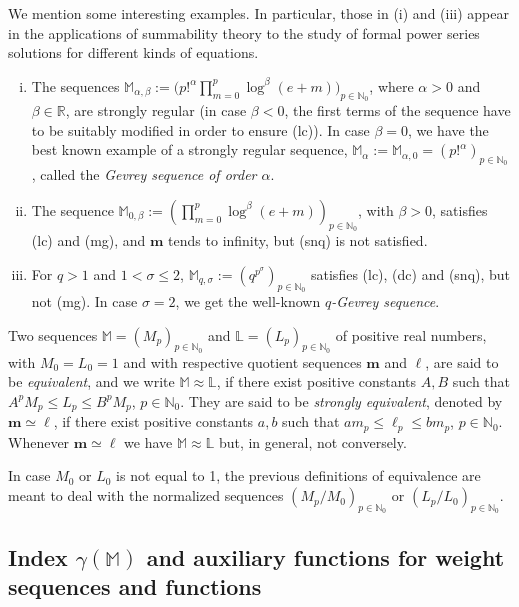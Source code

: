 \documentclass[11pt,a4paper]{article}
\theoremstyle{plain}
\theoremstyle{definition}
\newcommand{\N}{\mathbb{N}}
\newcommand{\R}{\mathbb{R}}
\newcommand{\al}{\alpha}
\newcommand{\be}{\beta}
\newcommand{\bM}{\mathbb{M}}
\newcommand{\M}{\mathbb{M}}
\newcommand{\bL}{\mathbb{L}}
\newcommand{\m}{\boldsymbol{m}}
\newcommand{\bl}{\boldsymbol{\ell}}
\def\ga{\gamma}
\begin{document}
We mention some interesting examples. In particular, those in (i) and (iii) appear in the applications of summability theory to the study of formal power series solutions for different kinds of equations.
\begin{enumerate}[(i)]
\item The sequences $\M_{\al,\be}:=\big(p!^{\al}\prod_{m=0}^p\log^{\be}(e+m)\big)_{p\in\N_0}$, where $\al>0$ and $\be\in\R$, are strongly regular (in case $\be<0$, the first terms of the sequence have to be suitably modified in order to ensure (lc)). In case $\be=0$, we have the best known example of a strongly regular sequence, $\M_{\al}:=\M_{\al,0}=(p!^{\al})_{p\in\N_{0}}$, called the \emph{Gevrey sequence of order $\al$}.

\item The sequence $\M_{0,\be}:=(\prod_{m=0}^p\log^{\be}(e+m))_{p\in\N_0}$, with $\be>0$, satisfies (lc) and (mg), and $\m$ tends to infinity, but (snq) is not satisfied.
\item For $q>1$ and $1<\sigma\le 2$, $\M_{q,\sigma}:=(q^{p^\sigma})_{p\in\N_0}$ satisfies (lc), (dc) and (snq), but not (mg). In case $\sigma=2$, we get the well-known \emph{$q$-Gevrey sequence}.
\end{enumerate}

Two sequences $\bM=(M_{p})_{p\in\N_0}$ and $\bL=(L_{p})_{p\in\N_0}$ of positive real numbers,
with $M_0=L_0=1$ and with respective quotient sequences $\m$ and $\bl$, are said to be \emph{equivalent}, and we write $\M\approx\bL$, if there exist positive constants $A,B$ such that $A^pM_p\le L_p\le B^pM_p$, $p\in\N_0$. They are said to be \emph{strongly equivalent}, denoted by $\m\simeq\bl$, if there exist positive constants $a,b$ such that
$am_p\le \ell_p\le bm_p$, $p\in\N_0$. Whenever $\m\simeq\bl$ we have $\M\approx\bL$ but, in general, not conversely.

In case $M_0$ or $L_0$ is not equal to 1, the previous definitions of equivalence are meant to deal with the normalized sequences $(M_{p}/M_0)_{p\in\N_0}$ or $(L_{p}/L_0)_{p\in\N_0}$.


\subsection{Index $\ga(\M)$ and auxiliary functions for weight sequences and functions}\label{subsectIndexGammaM}
\end{document}
